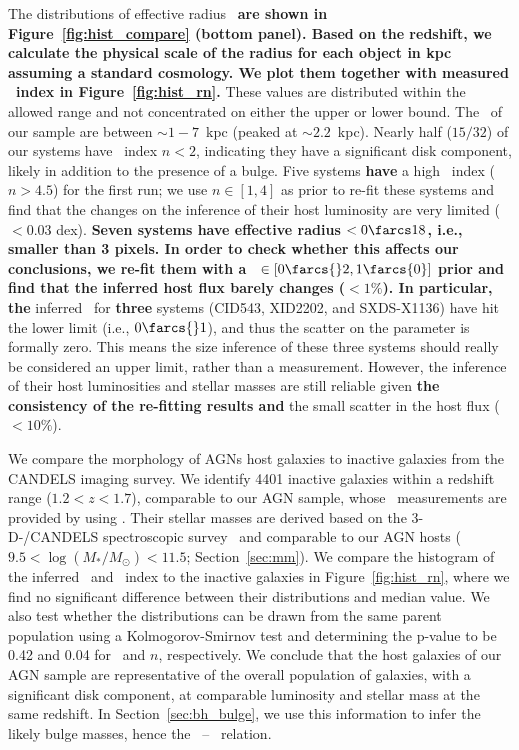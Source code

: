 \documentclass[apj]{emulateapj}
\begin{document}
The distributions of effective radius \Reff\ {\bf are shown in Figure~\ref{fig:hist_compare} {\bf (bottom panel)}. Based on the redshift, we calculate the physical scale of the radius for each object in kpc assuming a standard cosmology. We plot them together with measured \sersic\ index in Figure~\ref{fig:hist_rn}.} These values are distributed within the allowed range and not concentrated on either the upper or lower bound. The \Reff\ of our sample are between $\sim1-7$~kpc (peaked at $\sim2.2$~kpc). Nearly half ($15/32$) of our systems have \sersic\ index $n<2$, indicating they have a significant disk component, likely in addition to the presence of a bulge. Five systems {\bf have} a high \sersic\ index ($n>4.5$) for the first run; we use $n\in[1,4]$ as prior to re-fit these systems and find that the changes on the inference of their host luminosity are very limited ($<0.03$ dex). 
{\bf Seven systems have effective radius \Reff$<0\farcs18$, i.e., smaller than 3 pixels. In order to check whether this affects our conclusions,  we re-fit them with a \Reff\ $\in[0\farcs{}2,1\farcs{0}]$ prior and find that the inferred host flux barely changes ($<1\%$). In particular, the}
inferred \Reff\ for {\bf three} systems (CID543, XID2202, and SXDS-X1136) have hit the lower limit (i.e., $0\farcs{}1$), and thus the scatter on the parameter is formally zero. This means the size inference of these three systems should really be considered an upper limit, rather than a measurement. However, the inference of their host luminosities and stellar masses are still reliable given {\bf the consistency of the re-fitting results and} the small scatter in the host flux ($<10\%$).

We compare the morphology of AGNs host galaxies to inactive galaxies from the CANDELS imaging survey. We identify 4401 inactive galaxies within a redshift range ($1.2<z<1.7$), comparable to our AGN sample, whose \sersic\ measurements are provided by \citet{VDwel++2012} using \galfit. Their stellar masses are derived based on the 3-D-\hst/CANDELS spectroscopic survey~\citep{Momcheva2016, Brammer2012} and comparable to our AGN hosts ($9.5< \log (M_* /M_{\odot})< 11.5$; Section~\ref{sec:mm}). We compare the histogram of the inferred \Reff\ and \sersic\ index to the inactive galaxies in Figure~\ref{fig:hist_rn}, where we find no significant difference between their distributions and median value. We also test whether the distributions can be drawn from the same parent population using a Kolmogorov-Smirnov test and determining the p-value to be 0.42 and 0.04 for \Reff\ and $n$, respectively. We conclude that the host galaxies of our AGN sample are representative of the overall population of galaxies, with a significant disk component, at comparable luminosity and stellar mass at the same redshift. In Section~\ref{sec:bh_bulge}, we use this information to infer the likely bulge masses, hence the \mbh\ -- \bmass\ relation.
\end{document}
